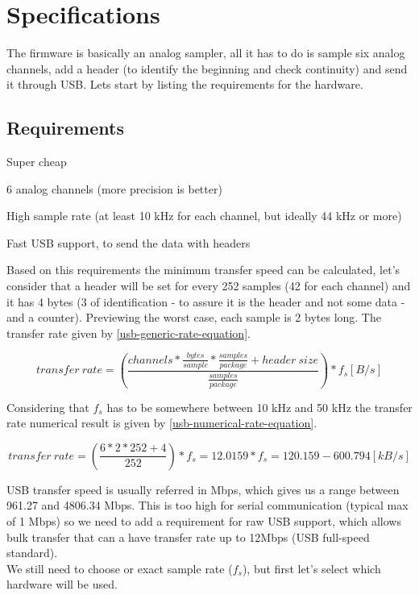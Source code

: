 \chapter{Specifications}
\label{firmware-specifications}

The firmware is basically an analog sampler, all it has to do is sample six analog
channels, add a header (to identify the beginning and check continuity) and send it
through USB. Lets start by listing the requirements for the hardware.

\section{Requirements}
\begin{itemlist}
  \item Super cheap
  \item 6 analog channels (more precision is better)
  \item High sample rate (at least 10 kHz for each channel, but ideally 44 kHz or more)
  \item Fast USB support, to send the data with headers
\end{itemlist}
Based on this requirements the minimum transfer speed can be calculated, let's
consider that a header will be set for every 252 samples (42 for each channel) and
it has 4 bytes (3 of identification - to assure it is the header and not some
data - and a counter). Previewing the worst case, each sample is 2 bytes long.
The transfer rate given by \autoref{usb-generic-rate-equation}.

\begin{equation}
  \label{usb-generic-rate-equation}
  transfer\ rate = \left( \frac{channels * \frac{bytes}{sample} * \frac{samples}{package} + header\ size}{\frac{samples}{package}}  \right ) * f_{s} [B/s]
\end{equation}

Considering that $f_{s}$ has to be somewhere between 10 kHz and 50 kHz the transfer
rate numerical result is given by \autoref{usb-numerical-rate-equation}.

\begin{equation}
  \label{usb-numerical-rate-equation}
  transfer\ rate = \left( \frac{6 * 2 * 252 + 4}{252}  \right ) * f_{s} = 12.0159 * f_{s} = 120.159 - 600.794 [kB/s]
\end{equation}

USB transfer speed is usually referred in Mbps, which gives us a range between
961.27 and 4806.34 Mbps. This is too high for serial communication (typical max of
1 Mbps) so we need to add a requirement for raw USB support, which allows bulk
transfer that can a have transfer rate up to 12Mbps (USB full-speed standard).\\
We still need to choose or exact sample rate ($f_{s}$), but first let's select which
hardware will be used.

